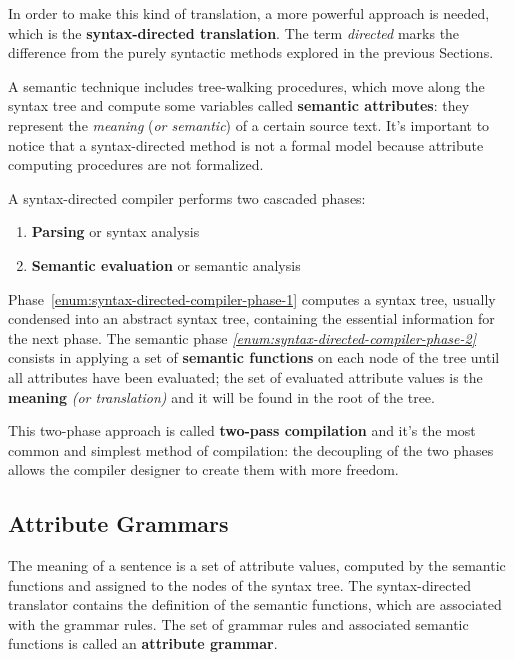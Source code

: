 \documentclass[english]{article}
\begin{document}
In order to make this kind of translation, a more powerful approach is needed, which is the \textbf{syntax-directed translation}.
The term \textit{directed} marks the difference from the purely syntactic methods explored in the previous Sections.

A semantic technique includes tree-walking procedures, which move along the syntax tree and compute some variables called \textbf{semantic attributes}:
they represent the \textit{meaning} (\textit{or semantic}) of a certain source text.
It's important to notice that a syntax-directed method is not a formal model because attribute computing procedures are not formalized.

A syntax-directed compiler performs two cascaded phases:

\begin{enumerate}[label=\arabic*., ref=(\arabic*)]
  \item\label{enum:syntax-directed-compiler-phase-1} \textbf{Parsing} or syntax analysis
  \item\label{enum:syntax-directed-compiler-phase-2} \textbf{Semantic evaluation} or semantic analysis
\end{enumerate}

Phase~\ref{enum:syntax-directed-compiler-phase-1} computes a syntax tree, usually condensed into an abstract syntax tree, containing the essential information for the next phase.
The semantic phase \textit{\ref{enum:syntax-directed-compiler-phase-2}} consists in applying a set of \textbf{semantic functions} on each node of the tree until all attributes have been evaluated;
the set of evaluated attribute values is the \textbf{meaning} \textit{(or translation)} and it will be found in the root of the tree.

This two-phase approach is called \textbf{two-pass compilation} and it's the most common and simplest method of compilation:
the decoupling of the two phases allows the compiler designer to create them with more freedom.

\subsection{Attribute Grammars}

The meaning of a sentence is a set of attribute values, computed by the semantic functions and assigned to the nodes of the syntax tree.
The syntax-directed translator contains the definition of the semantic functions, which are associated with the grammar rules.
The set of grammar rules and associated semantic functions is called an \textbf{attribute grammar}.
\end{document}
